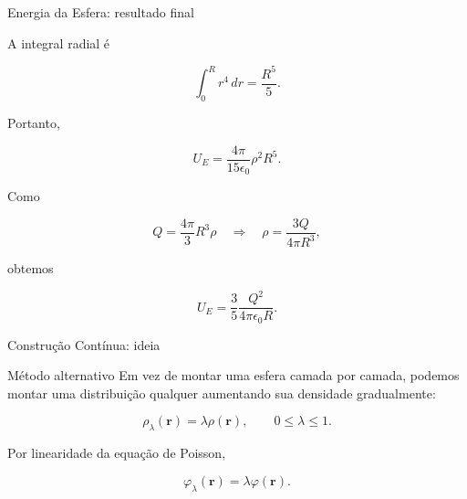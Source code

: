 \documentclass[aspectratio=169,11pt]{beamer}
\begin{document}
\begin{frame}{Energia da Esfera: resultado final}

A integral radial é

\begin{equation}
\int_0^R r^4\,dr = \frac{R^5}{5}.
\label{eq:int_r4}
\end{equation}

Portanto,

\begin{eqbox}
\begin{equation}
U_E
=
\frac{4\pi}{15\epsilon_0}\rho^2 R^5 .
\label{eq:UE_rho_R}
\end{equation}
\end{eqbox}

Como

\begin{equation}
Q=\frac{4\pi}{3}R^3\rho
\quad\Rightarrow\quad
\rho=\frac{3Q}{4\pi R^3},
\label{eq:rho_QR}
\end{equation}

\end{frame}

\begin{frame}

obtemos

\begin{eqbox}
\begin{equation}
U_E
=
\frac{3}{5}
\frac{Q^2}{4\pi\epsilon_0 R}.
\tag{3.77}
\end{equation}
\end{eqbox}

\end{frame}

\begin{frame}{Construção Contínua: ideia}

\begin{mybox}{Método alternativo}
Em vez de montar uma esfera camada por camada, podemos montar uma distribuição qualquer aumentando sua densidade gradualmente:
\end{mybox}

\begin{eqbox}
\begin{equation}
\rho_\lambda(\mathbf r)=\lambda \rho(\mathbf r),
\qquad 0\leq \lambda \leq 1 .
\label{eq:rho_lambda}
\end{equation}
\end{eqbox}

Por linearidade da equação de Poisson,

\begin{eqbox}
\begin{equation}
\varphi_\lambda(\mathbf r)=\lambda \varphi(\mathbf r).
\label{eq:phi_lambda}
\end{equation}
\end{eqbox}

\end{frame}
\end{document}
